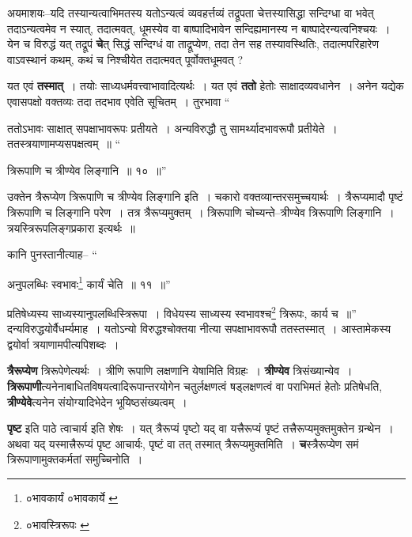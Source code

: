 \documentclass[article,12pt,a4paper]{memoir}
\begin{document}
	  \pstart अयमाशयः--यदि तस्यान्यत्वाभिमतस्य यतोऽन्यत्वं व्यवहर्त्तव्यं तद्रूपता चेत्तस्यासिद्धा सन्दिग्धा वा भवेत् तदाऽन्यत्वमेव न स्यात्, तदात्मवत्, धूमस्येव वा बाष्पादिभावेन सन्दिह्यमानस्य न बाष्पादेरन्यत्वनिश्चयः । येन च विरुद्धं यत् तद्रूपं \textbf{चे}त् सिद्धं सन्दिग्धं वा ताद्रूप्येण, तदा तेन सह तस्यावस्थितिः, तदात्मपरिहारेण वाऽवस्थानं कथम्, कथं च निश्चीयेत तदात्मवत् पूर्वोक्तधूमवत् ?
	\pend
      

	  \pstart यत एवं \textbf{तस्मात्} । तयोः साध्यधर्मवत्त्वाभावादित्यर्थः । यत एवं \textbf{ततो} हेतोः साक्षादव्यवधानेन । अनेन यद्येक एवासपक्षो वक्तव्यः तदा तदभाव एवेति सूचितम् । तुरभावा  \leavevmode{} “
	  
	ततोऽभावः साक्षात् सपक्षाभावरूपः प्रतीयते । अन्यविरुद्धौ तु सामर्थ्यादभावरूपौ प्रतीयेते । ततस्त्रयाणामप्यसपक्षत्वम् ॥ “
	  
	त्रिरूपाणि च त्रीण्येव लिङ्गानि ॥ १० ॥” 
	  
	उक्तेन त्रैरूप्येण त्रिरूपाणि च त्रीण्येव लिङ्गानि इति । चकारो वक्तव्यान्तरसमुच्चयार्थः । त्रैरूप्यमादौ पृष्टं त्रिरूपाणि च लिङ्गानि परेण । तत्र त्रैरूप्यमुक्तम् । त्रिरूपाणि चोच्यन्ते--त्रीण्येव त्रिरूपाणि लिङ्गानि । त्रयस्त्रिरूपलिङ्गप्रकारा इत्यर्थः ॥ 
	  
	कानि पुनस्तानीत्याह-- “
	  
	अनुपलब्धिः स्वभावः\footnote{०भावकार्यं \cite{dp-edE} ०भावकार्ये \cite{dp-msD} \cite{dp-msB} \cite{dp-edP} \cite{dp-edH} \cite{dp-edN}} कार्यं चेति ॥ ११ ॥” 
	  
	प्रतिषेध्यस्य साध्यस्यानुपलब्धिस्त्रिरूपा । विधेयस्य साध्यस्य स्वभावश्च\footnote{०भावस्त्रिरूपः \cite{dp-msA} \cite{dp-msB} \cite{dp-msD} \cite{dp-edP} \cite{dp-edH} \cite{dp-edE} \cite{dp-edN}} त्रिरूपः, कार्य च ॥” दन्यविरुद्धयोर्वैधर्म्यमाह । यतोऽन्यो विरुद्धश्चोक्तया नीत्या सपक्षाभावरूपौ ततस्तस्मात् । आस्तामेकस्य द्वयोर्वा त्रयाणामपीत्यपिशब्दः ।
	\pend
      

	  \pstart \textbf{त्रैरूप्येण} त्रिरूपेणेत्यर्थः । त्रीणि रूपाणि लक्षणानि येषामिति विग्रहः । \textbf{त्रीण्येव} त्रिसंख्यान्येव । \textbf{त्रिरूपाणी}त्यनेनाबाधितविषयत्वादिरूपान्तरयोगेन चतुर्लक्षणत्वं षड्लक्षणत्वं वा पराभिमतं हेतोः प्रतिषेधति, \textbf{त्रीण्येवे}त्यनेन संयोग्यादिभेदेन भूयिष्ठसंख्यत्वम् ।
	\pend
      

	  \pstart \textbf{पृष्ट} इति पाठे त्वाचार्य इति शेषः । यत् त्रैरूप्यं पृष्टो यद् वा यत्त्रैरूप्यं पृष्टं तत्त्रैरूप्यमुक्तमुक्तेन ग्रन्थेन । अथवा यद् यस्मात्त्रैरूप्यं पृष्ट आचार्यः, पृष्टं वा तत् तस्मात् त्रैरूप्यमुक्तमिति । \textbf{च}स्त्रैरूप्येण समं त्रिरूपाणामुक्तकर्मतां समुच्चिनोति ।
	\pend
      
\end{document}
